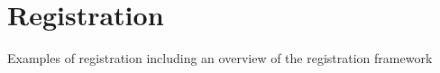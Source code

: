 \chapter{Registration}

Examples of registration including an overview of the registration framework

